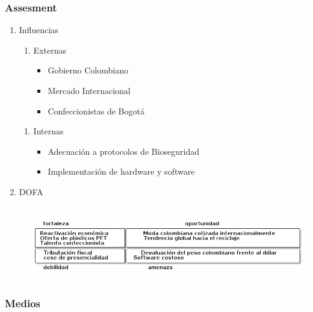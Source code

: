 \documentclass[11pt]{article}
\begin{document}
\subsubsection{Assesment}
\label{sec:org0e3ea05}
\begin{enumerate}
\item Influencias
\label{sec:org3914a09}

\begin{enumerate}
\item Externas

\begin{itemize}
\item Gobierno Colombiano
\item Mercado Internacional
\item Confeccionistas de Bogotá
\end{itemize}
\end{enumerate}


\begin{enumerate}
\item Internas

\begin{itemize}
\item Adecuación a protocolos de Bioseguridad
\item Implementación de hardware y software
\end{itemize}
\end{enumerate}

\item DOFA
\label{sec:org7210582}

\begin{center}
\includegraphics[width=.9\linewidth]{./assets/build/dofa.png}
\end{center}
\end{enumerate}


\subsubsection{Medios}
\label{sec:org9a5754b}
\end{document}
